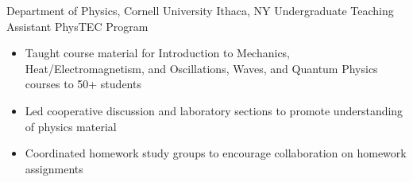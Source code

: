 
        {Department of Physics, Cornell University}
        {Ithaca, NY}
        {Undergraduate Teaching Assistant}
        {PhysTEC Program}{
    \begin{itemize}
        \item Taught course material for Introduction to Mechanics, Heat/Electromagnetism, and Oscillations, Waves, and Quantum Physics courses to 50+ students
        \item Led cooperative discussion and laboratory sections to promote understanding of physics material
        \item Coordinated homework study groups to encourage collaboration on homework assignments
    \end{itemize}
}
